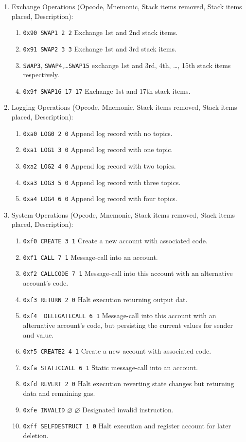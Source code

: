 \begin{enumerate}
\item Exchange Operations (Opcode, Mnemonic, Stack items removed, Stack items placed, Description):
\begin{enumerate}
\item\verb|0x90 SWAP1 2 2| Exchange 1st and 2nd stack items.
\item\verb|0x91 SWAP2 3 3| Exchange 1st and 3rd stack items.
\item\verb|SWAP3|, \verb|SWAP4|,\dots \verb|SWAP15| exchange 1st and 3rd, 4th, \dots , 15th stack items respectively.
\item\verb|0x9f SWAP16 17 17| Exchange 1st and 17th stack items.
\end{enumerate}

\item Logging Operations (Opcode, Mnemonic, Stack items removed, Stack items placed, Description):

\begin{enumerate}
\item\verb|0xa0 LOG0 2 0| Append log record with no topics.
\item\verb|0xa1 LOG1 3 0| Append log record with one topic.
\item\verb|0xa2 LOG2 4 0| Append log record with two topics.
\item\verb|0xa3 LOG3 5 0| Append log record with three topics.
\item\verb|0xa4 LOG4 6 0| Append log record with four topics.
\end{enumerate}

\item System Operations (Opcode, Mnemonic, Stack items removed, Stack items placed, Description):
\begin{enumerate}
\item\verb|0xf0 CREATE 3 1| Create a new account with associated code.
\item\verb|0xf1 CALL 7 1| Message-call into an account.
\item\verb|0xf2 CALLCODE 7 1| Message-call into this account with an alternative account's code.
\item\verb|0xf3 RETURN 2 0| Halt execution returning output dat.
\item\verb|0xf4  DELEGATECALL 6 1| Message-call into this account with an alternative account's code, but persisting the current values for sender and value.
\item\verb|0xf5 CREATE2 4 1| Create a new account with associated code.
\item\verb|0xfa STATICCALL 6 1| Static message-call into an account.
\item\verb|0xfd REVERT 2 0| Halt execution reverting state changes but returning data and remaining gas.
\item\verb|0xfe INVALID| $\varnothing$ $\varnothing$ Designated invalid instruction.
\item\verb|0xff SELFDESTRUCT 1 0| Halt execution and register account for later deletion.
\end{enumerate}


\end{enumerate}
